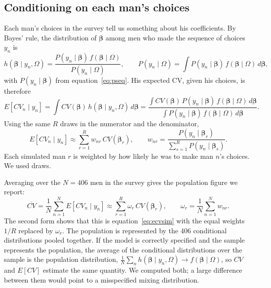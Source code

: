 \documentclass[11pt]{article}
\numberwithin{equation}{section}\numberwithin{figure}{section}\numberwithin{table}{section}
\begin{document}
\subsection{Conditioning on each man's choices}
Each man's choices in the survey tell us something about his coefficients. By Bayes' rule, the distribution of $\boldsymbol{\beta}$ among men who made the sequence of choices $y_n$ is\cite{RN89}
\begin{equation}\label{eq:post}
h(\boldsymbol{\beta} \mid y_n, \Omega) = \frac{P(y_n \mid \boldsymbol{\beta})\, f(\boldsymbol{\beta} \mid \Omega)}{P(y_n \mid \Omega)}, \qquad P(y_n \mid \Omega) = \int P(y_n \mid \boldsymbol{\beta})\, f(\boldsymbol{\beta} \mid \Omega)\, d\boldsymbol{\beta},
\end{equation}
with $P(y_n \mid \boldsymbol{\beta})$ from equation~\ref{eq:pseq}. His expected CV, given his choices, is therefore
\begin{equation}\label{eq:cvpost}
E[CV_n \mid y_n] = \int CV(\boldsymbol{\beta})\, h(\boldsymbol{\beta} \mid y_n, \Omega)\, d\boldsymbol{\beta} = \frac{\int CV(\boldsymbol{\beta})\, P(y_n \mid \boldsymbol{\beta})\, f(\boldsymbol{\beta} \mid \Omega)\, d\boldsymbol{\beta}}{\int P(y_n \mid \boldsymbol{\beta})\, f(\boldsymbol{\beta} \mid \Omega)\, d\boldsymbol{\beta}}.
\end{equation}
Using the same $R$ draws in the numerator and the denominator,
\begin{equation}\label{eq:cvpostsim}
E[CV_n \mid y_n] \approx \sum_{r=1}^{R} w_{nr}\, CV(\boldsymbol{\beta}_r), \qquad w_{nr} = \frac{P(y_n \mid \boldsymbol{\beta}_r)}{\sum_{s=1}^{R} P(y_n \mid \boldsymbol{\beta}_s)}.
\end{equation}
Each simulated man $r$ is weighted by how likely he was to make man $n$'s choices. We used \mmcMXsimMen{} draws.

Averaging over the $N = 406$ men in the survey gives the population figure we report:
\begin{equation}\label{eq:cvbar}
\overline{CV} = \frac{1}{N}\sum_{n=1}^{N} E[CV_n \mid y_n] \approx \sum_{r=1}^{R} \omega_r\, CV(\boldsymbol{\beta}_r), \qquad \omega_r = \frac{1}{N}\sum_{n=1}^{N} w_{nr}.
\end{equation}
The second form shows that this is equation~\ref{eq:ecvsim} with the equal weights $1/R$ replaced by $\omega_r$. The population is represented by the 406 conditional distributions pooled together. If the model is correctly specified and the sample represents the population, the average of the conditional distributions over the sample is the population distribution, $\frac{1}{N}\sum_n h(\boldsymbol{\beta} \mid y_n, \Omega) \rightarrow f(\boldsymbol{\beta} \mid \Omega)$,\cite{RN89} so $\overline{CV}$ and $E[CV]$ estimate the same quantity. We computed both; a large difference between them would point to a misspecified mixing distribution.
\end{document}
